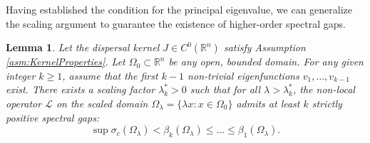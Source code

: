 \documentclass[12pt, a4paper]{article}
\theoremstyle{break}
\theoremstyle{break}
\theoremstyle{break}
\theoremstyle{break}
\theoremstyle{break}
\newtheorem{lem}{Lemma}[section]
\theoremstyle{break}
\theoremstyle{break}
\theoremstyle{break}
\theoremstyle{break}
\begin{document}
Having established the condition for the principal eigenvalue, we can generalize the scaling argument to guarantee the existence of higher-order spectral gaps.

\begin{lem}
    \label{lem:large_domain_gap_k}
    Let the dispersal kernel $J \in C^0(\mathbb{R}^n)$ satisfy Assumption \ref{asm:KernelProperties}. Let $\Omega_0 \subset \mathbb{R}^n$ be any open, bounded domain. For any given integer $k \geq 1$, assume that the first $k-1$ non-trivial eigenfunctions $v_1, \dots, v_{k-1}$ exist. There exists a scaling factor $\lambda_k^* > 0$ such that for all $\lambda > \lambda_k^*$, the non-local operator $\mathcal{L}$ on the scaled domain $\Omega_\lambda = \{ \lambda x : x \in \Omega_0 \}$ admits at least $k$ strictly positive spectral gaps:
    \begin{equation}
        \sup \sigma_c(\Omega_\lambda) < \beta_k(\Omega_\lambda) \leq \dots \leq \beta_1(\Omega_\lambda).
    \end{equation}
\end{lem}
\end{document}
